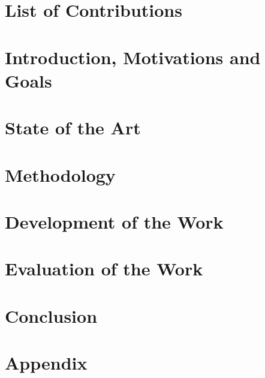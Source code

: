 \documentclass[12pt,twoside]{report}
\begin{document}
\tableofcontents
\clearpage\pagestyle{empty}\mbox{}\clearpage
\listoffigures
\clearpage\pagestyle{empty}\mbox{}\clearpage
\listoftables
\clearpage\pagestyle{empty}\mbox{}\clearpage
\chapter*{List of Contributions}

\clearpage\pagestyle{empty}\mbox{}\clearpage
\chapter{Introduction, Motivations and Goals}

\clearpage\pagestyle{empty}\mbox{}\clearpage
\chapter{State of the Art}

\chapter{Methodology}

\chapter{Development of the Work}

\chapter{Evaluation of the Work}

\chapter{Conclusion}

\appendix
\chapter{Appendix}

\printbibliography 
\end{document}
